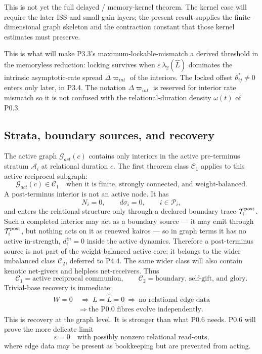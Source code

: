 \documentclass[11pt,a4paper]{article}
\def\mathfrak#1{#1}%
\def\mathrm#1{#1}%
\theoremstyle{definition}
\theoremstyle{plain}
\theoremstyle{remark}
\begin{document}
This is not yet the full delayed / memory-kernel theorem. The kernel case will
require the later ISS and small-gain layers; the present result supplies the
finite-dimensional graph skeleton and the contraction constant that those kernel
estimates must preserve.

This is what will make P3.3's maximum-lockable-mismatch a derived threshold in the
memoryless reduction: locking survives when $\varepsilon\,\lambda_2(\hat L)$
dominates the intrinsic asymptotic-rate spread $\Delta\varpi_{\mathrm{int}}$ of the
interiors. The locked offset $\theta^*_{ij}\neq0$ enters only later, in P3.4. The
notation $\Delta\varpi_{\mathrm{int}}$ is reserved for interior rate mismatch so it
is not confused with the relational-duration density $\omega(t)$ of P0.3.

\subsection{Strata, boundary sources, and recovery}

The active graph $\mathcal G_{\mathrm{act}}(\mathfrak c)$ contains only interiors in
the active pre-terminus stratum $\mathcal A_i$ at relational duration $\mathfrak c$.
The first theorem class $\mathcal C_1$ applies to this active reciprocal subgraph:
\[
\mathcal G_{\mathrm{act}}(\mathfrak c)\in\mathcal C_1
\quad\text{when it is finite, strongly connected, and weight-balanced.}
\]
A post-terminus interior is not an active node. It has
\[
N_i=0,\qquad d\sigma_i=0,\qquad i\in\mathcal P_i,
\]
and enters the relational structure only through a declared boundary trace
$\mathcal T_i^{\rm post}$. Such a completed interior may act as a boundary source ---
it may emit through $\mathcal T_i^{\rm post}$, but nothing acts on it as renewed
kairos --- so in graph terms it has no active in-strength, $d_i^{\mathrm{in}}=0$
inside the active dynamics. Therefore a post-terminus source is not part of the
weight-balanced active core; it belongs to the wider imbalanced class $\mathcal C_2$,
deferred to P4.4. The same wider class will also contain kenotic net-givers and
helpless net-receivers. Thus
\[
\mathcal C_1=\text{active reciprocal communion},\qquad
\mathcal C_2=\text{boundary, self-gift, and glory}.
\]
Trivial-base recovery is immediate:
\[
\begin{aligned}
W=0\ &\Longrightarrow\ L=\hat L=0\ \Longrightarrow\ \text{no relational edge data}\\
&\Longrightarrow\ \text{the P0.0 fibres evolve independently.}
\end{aligned}
\]
This is recovery at the graph level. It is stronger than what P0.6 needs. P0.6
will prove the more delicate limit
\[
\varepsilon=0
\quad\text{with possibly nonzero relational read-outs,}
\]
where edge data may be present as bookkeeping but are prevented from acting.
\end{document}
